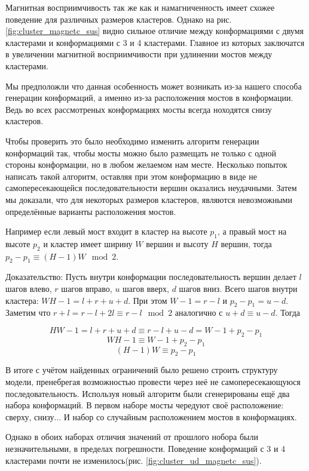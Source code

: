 \documentclass[14pt]{extarticle}
\begin{document}
Магнитная восприимчивость так же как и намагниченность имеет схожее поведение для различных размеров кластеров. Однако на рис. \ref*{fig:cluster_magnetc_sus} видно сильное отличие между конформациями с двумя кластерами и конформациями с 3 и 4 кластерами. Главное из которых заключатся в увеличении магнитной восприимчивости при удлинении мостов между кластерами.

Мы предположли что данная особенность может возникать из-за нашего способа генерации конформаций, а именно из-за расположения мостов в конформации. Ведь во всех рассмотреных конформациях мосты всегда ноходятся снизу кластеров.

Чтобы проверить это было необходимо изменить алгоритм генерации конформаций так, чтобы мосты можно было размещать не только с одной стороны конформации, но в любом желаемом нам месте.
Несколько попыток написать такой алгоритм, оставляя при этом конформацию в виде не самопересекающейся последовательности вершин оказались неудачными. Затем мы доказали, что для некоторых размеров кластеров, являются невозможными определённые варианты расположения мостов.

Например если левый мост входит в кластер на высоте $p_1$, а правый мост на высоте $p_2$ 
и кластер имеет ширину $W$ вершин и высоту $H$ вершин, тогда $p_2 - p_1 \equiv (H-1)W \mod 2$.

Доказательство: 
Пусть внутри конформации последовательность вершин делает $l$ шагов влево, $r$ шагов вправо, $u$ шагов вверх, $d$ шагов вниз. Всего шагов внутри кластера: $ W H - 1 = l + r + u + d $. При этом $W - 1 = r - l$ и $p_2 - p_1 = u - d$. Заметим что $ r + l = r - l + 2l \equiv r - l \mod 2$ аналогично с $u+d \equiv u-d$. Тогда

\[
    H W - 1 = l + r + u + d \equiv r - l + u - d = W - 1 + p_2 - p_1 
\]
\[
    W H - 1 \equiv W - 1 + p_2 - p_1
\]
\[    
    (H - 1)W \equiv p_2 - p_1
\]

В итоге с учётом найденных ограничений было решено строить структуру модели, пренебрегая возможностью провести через неё не самопересекающуюся последовательность. 
Используя новый алгоритм были сгенерированы ещё два набора конформаций. В первом наборе мосты чередуют своё расположение: сверху, снизу... И набор со случайным расположением мостов в конформациях.

Однако в обоих наборах отличия значений от прошлого нобора были незначительными, в пределах погрешности. Поведение конформаций с 3 и 4 кластерами почти не изменилось(рис. \ref*{fig:cluster_ud_magnetc_sus}). 
\end{document}

